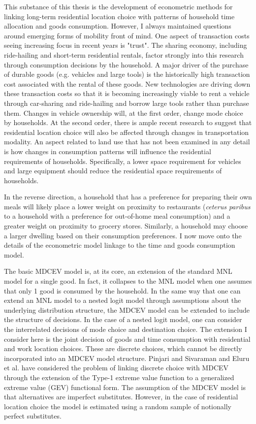 This substance of this thesis is the development of econometric methods for linking long-term residential location choice with patterns of household time allocation and goods consumption. However, I always maintained questions around emerging forms of mobility front of mind. One aspect of transaction costs seeing increasing focus in recent years is "trust". The sharing economy, including ride-hailing and short-term residential rentals, factor strongly into this research through consumption decisions by the household. A major driver of the purchase of durable goods (e.g. vehicles and large tools) is the historically high transaction cost associated with the rental of these goods. New technologies are driving down these transaction costs so that it is becoming increasingly viable to rent a vehicle through car-sharing and ride-hailing and borrow large tools rather than purchase them. Changes in vehicle ownership will, at the first order, change mode choice by households. At the second order, there is ample recent research to suggest that residential location choice will also be affected through changes in transportation modality. An aspect related to land use that has not been examined in any detail is how changes in consumption patterns will influence the residential requirements of households. Specifically, a lower space requirement for vehicles and large equipment should reduce the residential space requirements of households.

In the reverse direction, a household that has a preference for preparing their own meals will likely place a lower weight on proximity to restaurants (\textit{ceterus paribus} to a household with a preference for out-of-home meal consumption) and a greater weight on proximity to grocery stores. Similarly, a household may choose a larger dwelling based on their consumption preferences. I now move onto the details of the econometric model linkage to the time and goods consumption model.

The basic MDCEV model is, at its core, an extension of the standard MNL model for a single good. In fact, it collapses to the MNL model when one assumes that only 1 good is consumed by the household. In the same way that one can extend an MNL model to a nested logit model through assumptions about the underlying distribution structure, the MDCEV model can be extended to include the structure of decisions. In the case of a nested logit model, one can consider the interrelated decisions of mode choice and destination choice. The extension I consider here is the joint decision of goods and time consumption with residential and work location choices. These are discrete choices, which cannot be directly incorporated into an MDCEV model structure. Pinjari and Sivaraman \cite{RawoofPinjari2012ASystem} and Eluru et al. \cite{Eluru2010ANBEHAVIOR} have considered the problem of linking discrete choice with MDCEV through the extension of the Type-1 extreme value function to a generalized extreme value (GEV) functional form. The assumption of the MDCEV model is that alternatives are imperfect substitutes. However, in the case of residential location choice the model is estimated using a random sample of notionally perfect substitutes.  

